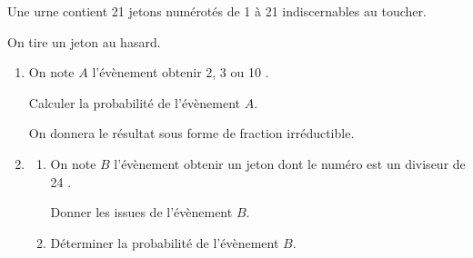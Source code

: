 \medskip

Une urne contient 21 jetons numérotés de 1 
à 21 indiscernables au toucher.

On tire un jeton au hasard.

\begin{enumerate}
\item On note $A$ l'évènement \og obtenir 2, 3 ou 10 \fg.

Calculer la probabilité de l'évènement $A$.

On donnera le résultat sous forme de fraction irréductible.
\item 
	\begin{enumerate}
		\item On note $B$ l'évènement \og obtenir un jeton dont le numéro est un diviseur de 24 \fg. 

Donner les issues de l'évènement $B$.
		\item Déterminer la probabilité de l'évènement $B$.
	\end{enumerate}
\end{enumerate}

\medskip
